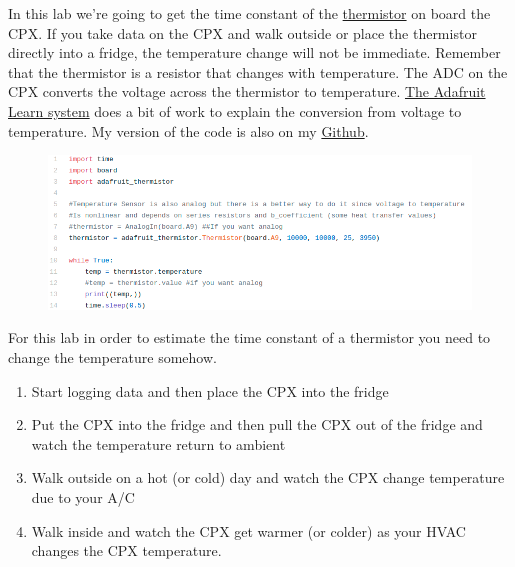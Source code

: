 In this lab we’re going to get the time constant of the \href{https://en.wikipedia.org/wiki/Thermistor}{thermistor} on board the CPX. If you take data on the CPX and walk outside or place the thermistor directly into a fridge, the temperature change will not be immediate. Remember that the thermistor is a resistor that changes with temperature. The ADC on the CPX converts the voltage across the thermistor to temperature. \href{https://learn.adafruit.com/thermistor/circuitpython}{The Adafruit Learn system} does a bit of work to explain the conversion from voltage to temperature. My version of the code is also on my \href{https://github.com/cmontalvo251/Microcontrollers/blob/master/Circuit_Playground/CircuitPython/Temp/record_temperature_thermistor.py}{Github}.
\begin{figure}[H]
  \begin{center}
    \includegraphics[width=\textwidth]{Figures/thermistor.png}
  \end{center}
\end{figure}
For this lab in order to estimate the time constant of a thermistor you need to change the temperature somehow.
\begin{enumerate}[itemsep=-5pt]
\item Start logging data and then place the CPX into the fridge
\item Put the CPX into the fridge and then pull the CPX out of the fridge and watch the temperature return to ambient
\item Walk outside on a hot (or cold) day and watch the CPX change temperature due to your A/C
\item Walk inside and watch the CPX get warmer (or colder) as your HVAC changes the CPX temperature.
\end{enumerate}

